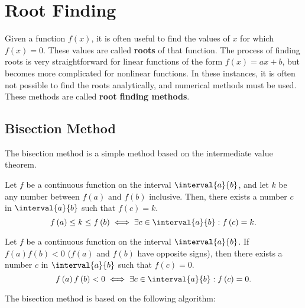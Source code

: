 \documentclass{article}
\begin{document}
\section{Root Finding}
Given a function \(f\left( x \right)\), it is often useful to find the
values of \(x\) for which \(f\left( x \right) = 0\). These values are
called \textbf{roots} of that function. The process of finding roots is
very straightforward for linear functions of the form \(f\left( x
\right) = a x + b\), but becomes more complicated for nonlinear
functions. In these instances, it is often not possible to find the
roots analytically, and numerical methods must be used. These methods
are called \textbf{root finding methods}.
\subsection{Bisection Method}
The bisection method is a simple method based on the intermediate value
theorem.
\begin{theorem}
    Let \(f\) be a continuous function on the interval
    \(\interval{a}{b}\), and let \(k\) be any number between
    \(f\left( a \right)\) and \(f\left( b \right)\) inclusive. Then,
    there exists a number \(c\) in \(\interval{a}{b}\) such that
    \(f\left( c \right) = k\).
    \begin{equation*}
        f\left( a \right) \leq k \leq f\left( b \right) \iff \exists c \in \interval{a}{b} : f\left( c \right) = k.
    \end{equation*}
\end{theorem}
\begin{corollary}
    Let \(f\) be a continuous function on the interval
    \(\interval{a}{b}\). If \(f\left( a \right) f\left( b \right) < 0\)
    (\(f\left( a \right)\) and \(f\left( b \right)\) have opposite
    signs), then there exists a number \(c\) in \(\interval{a}{b}\) such
    that \(f\left( c \right) = 0\).
    \begin{equation*}
        f\left( a \right) f\left( b \right) < 0 \iff \exists c \in \interval{a}{b} : f\left( c \right) = 0.
    \end{equation*}
\end{corollary}
The bisection method is based on the following algorithm:
\end{document}
